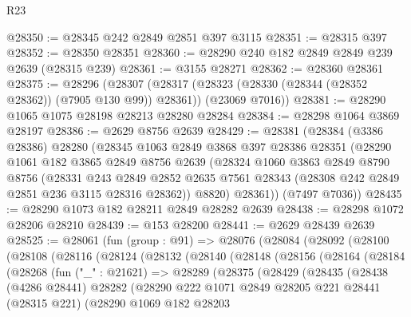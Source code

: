 \begin{lexlean}{R23}
\begin{coremodule}
@28350 := @28345 @242 @2849 @2851 @397 @3115
@28351 := @28315 @397
@28352 := @28350 @28351
@28360 := @28290 @240 @182 @2849 @2849 @239 @2639 (@28315 @239)
@28361 := @3155 @28271
@28362 := @28360 @28361
@28375 := @28296
    (@28307
      (@28317 (@28323 (@28330 (@28344 (@28352 @28362)) (@7905 @130 @99)) @28361))
      (@23069 @7016))
@28381 := @28290 @1065 @1075 @28198 @28213 @28280 @28284
@28384 := @28298 @1064 @3869 @28197
@28386 := @2629 @8756 @2639
@28429 := @28381
    (@28384
      (@3386 @28386)
      @28280
      (@28345
        @1063
        @2849
        @3868
        @397
        @28386
        @28351
        (@28290
          @1061
          @182
          @3865
          @2849
          @8756
          @2639
          (@28324
            @1060
            @3863
            @2849
            @8790
            @8756
            (@28331
              @243
              @2849
              @2852
              @2635
              @7561
              @28343
              (@28308 @242 @2849 @2851 @236 @3115 @28316 @28362))
            @8820)
          @28361))
      (@7497 @7036))
@28435 := @28290 @1073 @182 @28211 @2849 @28282 @2639
@28438 := @28298 @1072 @28206 @28210
@28439 := @153 @28200
@28441 := @2629 @28439 @2639
@28525 := @28061
    (fun (group : @91) =>
    @28076
      (@28084
        (@28092
          (@28100
            (@28108
              (@28116
                (@28124
                  (@28132
                    (@28140
                      (@28148
                        (@28156
                          (@28164
                            (@28184
                              (@28268
                                (fun ("_" : @21621) =>
                                @28289
                                  (@28375
                                    (@28429
                                      (@28435
                                        (@28438
                                          (@4286 @28441)
                                          @28282
                                          (@28290
                                            @222
                                            @1071
                                            @2849
                                            @28205
                                            @221
                                            @28441
                                            (@28315 @221)
                                            (@28290
                                              @1069
                                              @182
                                              @28203

\end{coremodule}
\end{lexlean}
